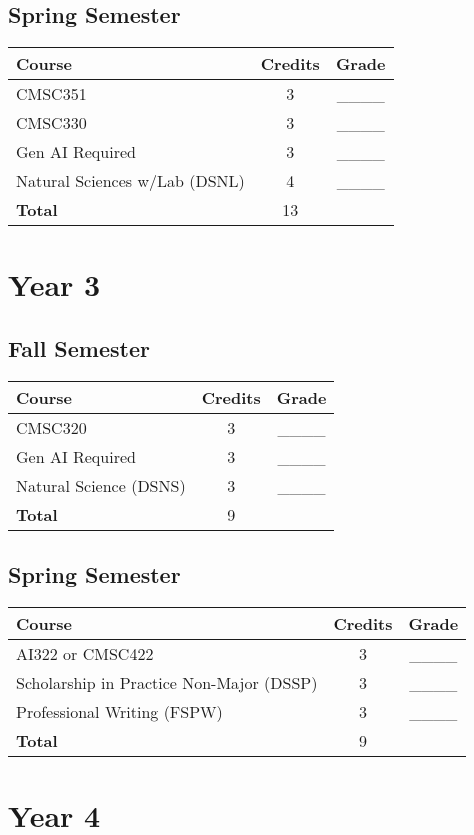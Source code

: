 \documentclass{article}
\begin{document}
\subsection*{Spring Semester}
\begin{tabular}{|l|c|c|}
    \hline
    Course & Credits & Grade \\
    \hline
    CMSC351 & 3 & ____ \\
    CMSC330 & 3 & ____ \\
    Gen AI Required & 3 & ____ \\
    Natural Sciences w/Lab (DSNL) & 4 & ____ \\
    \hline
    \textbf{Total} & 13 & \\
    \hline
\end{tabular}

\section*{Year 3}
\subsection*{Fall Semester}
\begin{tabular}{|l|c|c|}
    \hline
    Course & Credits & Grade \\
    \hline
    CMSC320 & 3 & ____ \\
    Gen AI Required & 3 & ____ \\
    Natural Science (DSNS) & 3 & ____ \\
    \hline
    \textbf{Total} & 9 & \\
    \hline
\end{tabular}

\subsection*{Spring Semester}
\begin{tabular}{|l|c|c|}
    \hline
    Course & Credits & Grade \\
    \hline
    AI322 or CMSC422 & 3 & ____ \\
    Scholarship in Practice Non-Major (DSSP) & 3 & ____ \\
    Professional Writing (FSPW) & 3 & ____ \\
    \hline
    \textbf{Total} & 9 & \\
    \hline
\end{tabular}

\section*{Year 4}
\end{document}
